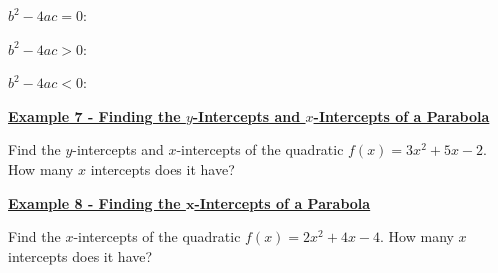 \documentclass[12pt]{book}
\begin{document}
$b^2-4ac =0$: 

$b^2-4ac >0$: 

$b^2-4ac < 0$:


\vspace{5mm}

\underline{\textbf{Example 7 - Finding the $y$-Intercepts and $x$-Intercepts of a Parabola}}

Find the $y$-intercepts and $x$-intercepts of the quadratic $f(x)=3x^2+5x-2$. How many $x$ intercepts does it have?


\newpage

\underline{\textbf{Example 8 - Finding the $\mathbf x$-Intercepts of a Parabola}}

Find the $x$-intercepts of the quadratic $f(x)=2x^2+4x-4$. How many $x$ intercepts does it have?
\end{document}
